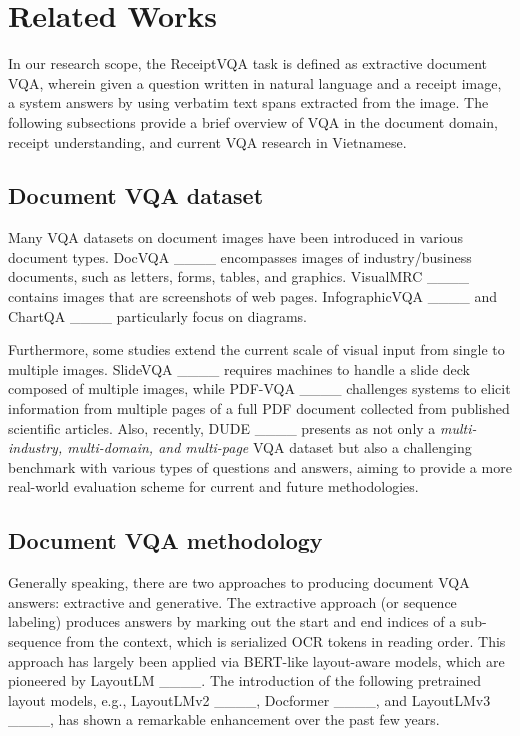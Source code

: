 \section{Related Works}
\label{sec:RelatedWorks}

In our research scope, the ReceiptVQA task is defined as extractive document VQA, wherein given a question written in natural language and a receipt image, a system answers by using verbatim text spans extracted from the image. The following subsections provide a brief overview of VQA in the document domain, receipt understanding, and current VQA research in Vietnamese. 


\subsection{Document VQA dataset} \label{sec:rel_docvqa_data}

Many VQA datasets on document images have been introduced in various document types. DocVQA ____ encompasses images of industry/business documents, such as letters, forms, tables, and graphics. VisualMRC ____ contains images that are screenshots of web pages. InfographicVQA ____ and ChartQA ____ particularly focus on diagrams.

Furthermore, some studies extend the current scale of visual input from single to multiple images. SlideVQA ____ requires machines to handle a slide deck composed of multiple images, while PDF-VQA ____ challenges systems to elicit information from multiple pages of a full PDF document collected from published scientific articles. Also, recently, DUDE ____ presents as not only a \textit{multi-industry, multi-domain, and multi-page} VQA dataset but also a challenging benchmark with various types of questions and answers, aiming to provide a more real-world evaluation scheme for current and future methodologies.

\subsection{Document VQA methodology} \label{sec:rel_docvqa_med}

Generally speaking, there are two approaches to producing document VQA answers: extractive and generative. The extractive approach (or sequence labeling) produces answers by marking out the start and end indices of a sub-sequence from the context, which is serialized OCR tokens in reading order. This approach has largely been applied via BERT-like layout-aware models, which are pioneered by LayoutLM ____. The introduction of the following pretrained layout models, e.g., LayoutLMv2 ____, Docformer ____, and LayoutLMv3 ____, has shown a remarkable enhancement over the past few years.

